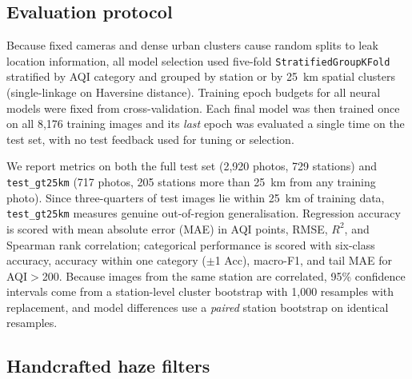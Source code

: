\documentclass[conference]{IEEEtran}
\begin{document}
\subsection{Evaluation protocol}

Because fixed cameras and dense urban clusters cause random splits to leak
location information, all model selection used five-fold
\texttt{StratifiedGroupKFold} stratified by AQI category and grouped by station
or by 25~km spatial clusters (single-linkage on Haversine distance). Training
epoch budgets for all neural models were fixed from cross-validation. Each final
model was then trained once on all 8,176 training images and its \emph{last}
epoch was evaluated a single time on the test set, with no test feedback used
for tuning or selection.

We report metrics on both the full test set (2,920 photos, 729 stations) and
\texttt{test\_gt25km} (717 photos, 205 stations more than 25~km from any
training photo). Since three-quarters of test images lie within 25~km of
training data, \texttt{test\_gt25km} measures genuine out-of-region
generalisation. Regression accuracy is scored with mean absolute error (MAE) in
AQI points, RMSE, $R^2$, and Spearman rank correlation; categorical performance
is scored with six-class accuracy, accuracy within one category ($\pm$1 Acc),
macro-F1, and tail MAE for AQI$>$200. Because images from the same station are
correlated, 95\% confidence intervals come from a station-level cluster
bootstrap with 1,000 resamples with replacement, and model differences use a
\emph{paired} station bootstrap on identical resamples.

\subsection{Handcrafted haze filters}
\end{document}
